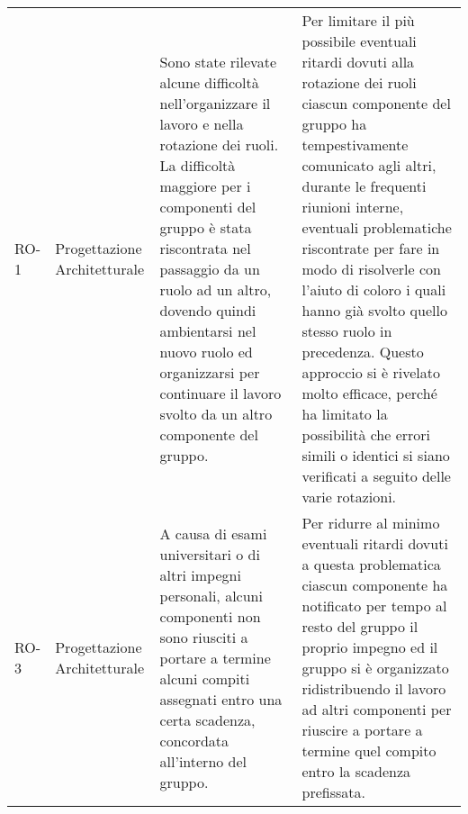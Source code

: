 \begin{appendices}
\begin{longtable}{
		>{\centering}p{}
		>{\centering}p{}
		>{\centering\arraybackslash}p{}
		>{\centering\arraybackslash}p{} }
		RO-1
		&
		Progettazione Architetturale
		&
		Sono state rilevate alcune difficoltà nell'organizzare il lavoro e nella rotazione dei ruoli.
		La difficoltà maggiore per i componenti del gruppo è stata riscontrata nel passaggio da un ruolo ad un altro, dovendo quindi ambientarsi nel nuovo ruolo ed organizzarsi per continuare il lavoro svolto da un altro componente del gruppo.
		&
		Per limitare il più possibile eventuali ritardi dovuti alla rotazione dei ruoli ciascun componente del gruppo ha tempestivamente comunicato agli altri, durante le frequenti riunioni interne, eventuali problematiche riscontrate per fare in modo di risolverle con l'aiuto di coloro i quali hanno già svolto quello stesso ruolo in precedenza.
		Questo approccio si è rivelato molto efficace, perché ha limitato la possibilità che errori simili o identici si siano verificati a seguito delle varie rotazioni. \\

		RO-3
		&
		Progettazione Architetturale
		&
		A causa di esami universitari o di altri impegni personali, alcuni componenti non sono riusciti a portare a termine alcuni compiti assegnati entro una certa scadenza, concordata all'interno del gruppo.
		&
		Per ridurre al minimo eventuali ritardi dovuti a questa problematica ciascun componente ha notificato per tempo al resto del gruppo il proprio impegno ed il gruppo si è organizzato ridistribuendo il lavoro ad altri componenti per riuscire a portare a termine quel compito entro la scadenza prefissata.  \\


\end{longtable}
\end{appendices}
